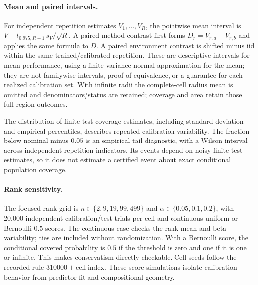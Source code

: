 \paragraph{Mean and paired intervals.}
For independent repetition estimates $V_1,\ldots,V_R$, the pointwise mean interval is $\bar V\pm t_{0.975,R-1}\,s_V/\sqrt{R}$. A paired method contrast first forms $D_r=V_{r,a}-V_{r,b}$ and applies the same formula to $D$. A paired environment contrast is shifted minus iid within the same trained/calibrated repetition. These are descriptive intervals for mean performance, using a finite-variance normal approximation for the mean; they are not familywise intervals, proof of equivalence, or a guarantee for each realized calibration set. With infinite radii the complete-cell radius mean is omitted and denominators/status are retained; coverage and area retain those full-region outcomes.

The distribution of finite-test coverage estimates, including standard deviation and empirical percentiles, describes repeated-calibration variability. The fraction below nominal minus $0.05$ is an empirical tail diagnostic, with a Wilson interval across independent repetition indicators. Its events depend on noisy finite test estimates, so it does not estimate a certified event about exact conditional population coverage.

\paragraph{Rank sensitivity.}
The focused rank grid is $n\in\{2,9,19,99,499\}$ and $\alpha\in\{0.05,0.1,0.2\}$, with 20,000 independent calibration/test trials per cell and continuous uniform or Bernoulli-$0.5$ scores. The continuous case checks the rank mean and beta variability; ties are included without randomization. With a Bernoulli score, the conditional covered probability is $0.5$ if the threshold is zero and one if it is one or infinite. This makes conservatism directly checkable. Cell seeds follow the recorded rule $310000+$cell index. These score simulations isolate calibration behavior from predictor fit and compositional geometry.

